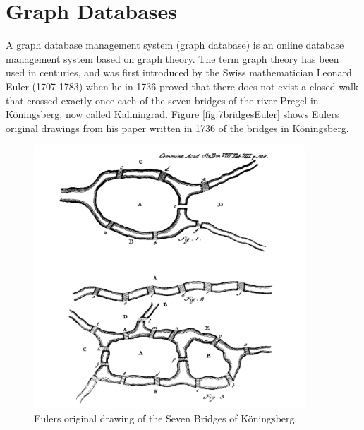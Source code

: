 \section{Graph Databases}
A graph database management system (graph database) \citep{robinson13} is an online database management system %
based on graph theory. The term graph theory has been used in centuries, and was first introduced by the Swiss mathematician Leonard Euler (1707-1783) when he in 1736 proved that there does not exist a closed walk that crossed exactly once each of the seven bridges of the river Pregel in Köningsberg, now called Kaliningrad\citep{alexanderson06}. Figure \vref{fig:7bridgesEuler} shows Eulers original drawings from his paper written in 1736 \citep{euler1741} of the bridges in Köningsberg. 

\begin{figure}[H]
  \centering
  \includegraphics[width=4in]{assets/7bridges-euler.png}
  \caption{Eulers original drawing of the Seven Bridges of Köningsberg} 
  \label{fig:7bridgesEuler}
\end{figure}

